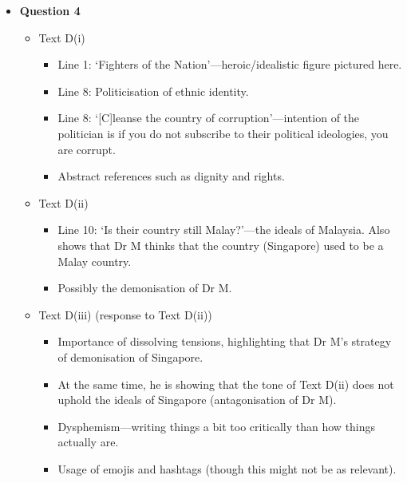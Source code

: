 \documentclass[../main.tex]{subfiles}
\begin{document}
\begin{itemize}
					\item \textbf{Question 4} \begin{itemize}
						\item Text D(i) \begin{itemize}
							\item Line 1: `Fighters of the Nation'---heroic/idealistic figure pictured here.
							\item Line 8: Politicisation of ethnic identity.
							\item Line 8: `[C]leanse the country of corruption'---intention of the politician is if you do not subscribe to their political ideologies, you are corrupt.
							\item Abstract references such as dignity and rights.
						\end{itemize}
						\item Text D(ii) \begin{itemize}
							\item Line 10: `Is their country still Malay?'---the ideals of Malaysia. Also shows that Dr M thinks that the country (Singapore) used to be a Malay country.
							\item Possibly the demonisation of Dr M.
						\end{itemize}
						\item Text D(iii) (response to Text D(ii)) \begin{itemize}
							\item Importance of dissolving tensions, highlighting that Dr M's strategy of demonisation of Singapore.
							\item At the same time, he is showing that the tone of Text D(ii) does not uphold the ideals of Singapore (antagonisation of Dr M).
							\item Dysphemism---writing things a bit too critically than how things actually are.
							\item Usage of emojis and hashtags (though this might not be as relevant).
						\end{itemize}
					\end{itemize}
				\end{itemize}
\end{document}
